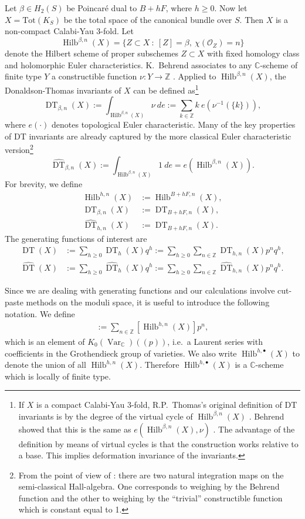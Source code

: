 \documentclass{amsart}
\theoremstyle{definition}
\newcommand{\CC} {\mathbb{C}}          %
\newcommand{\ZZ} {\mathbb{Z}}		%
\renewcommand{\O}{\mathcal{O}}
\newcommand{\Hilb}{\operatorname{Hilb}}
\newcommand{\DT}{\operatorname{DT}}
\newcommand{\Var}{\operatorname{Var}}
\begin{document}
Let $\beta \in H_2(S)$ be Poincar\'e dual to $B+hF$, where $h \geq 0$. 
Now let $X = \mathrm{Tot}(K_S)$ be the total space of the canonical bundle over $S$. Then $X$ is a non-compact Calabi-Yau 3-fold. Let
$$
\Hilb^{\beta,n}(X) = \{ Z \subset X \ : \ [Z] = \beta, \ \chi(\O_Z) = n\}
$$
denote the Hilbert scheme of proper subschemes $Z \subset X$ with fixed homology class and holomorphic Euler characteristics. K.~Behrend associates to any $\CC$-scheme of finite type $Y$ a constructible function $\nu : Y \rightarrow \ZZ$ \cite{Beh}. Applied to $\Hilb^{\beta,n}(X)$, the Donaldson-Thomas invariants of $X$ can be defined as\footnote{If $X$ is a compact Calabi-Yau 3-fold, R.P.~Thomas's original definition of DT invariants is by the degree of the virtual cycle of $\Hilb^{\beta,n}(X)$ \cite{Tho}. Behrend showed that this is the same as $e(\Hilb^{\beta,n}(X),\nu)$ \cite{Beh}. The advantage of the definition by means of virtual cycles is that the construction works relative to a base. This implies deformation invariance of the invariants.} 
$$
\DT_{\beta,n}(X) := \int_{\Hilb^{\beta,n}(X)} \nu \ de := \sum_{k \in \ZZ} k \ e(\nu^{-1}(\{k\})),
$$
where $e(\cdot)$ denotes topological Euler characteristic. Many of the key properties of DT invariants are already captured by the more classical Euler characteristic version\footnote{From the point of view of \cite{Joy, Bri}: there are two natural integration maps on the semi-classical Hall-algebra. One corresponds to weighing by the Behrend function and the other to weighing by the ``trivial'' constructible function which is constant equal to 1.}
$$
\widehat{\DT}_{\beta,n}(X) := \int_{\Hilb^{\beta,n}(X)} 1 \ de = e(\Hilb^{\beta,n}(X)).
$$
For brevity, we define
\begin{align*}
\Hilb^{h,n}(X) &:=\Hilb^{B+hF,n}(X), \\
\DT_{\beta,n}(X) &:= \DT_{B+hF,n}(X), \\
\widehat{\DT}_{h,n}(X) &:= \DT_{B+hF,n}(X).
\end{align*}
The generating functions of interest are
\begin{align*}
\DT(X) &:= \sum_{h \geq 0} \DT_h(X) q^h := \sum_{h \geq 0} \sum_{n \in \ZZ} \DT_{h,n}(X) p^n q^h, \\
\widehat{\DT}(X) &:= \sum_{h \geq 0} \widehat{\DT}_h(X) q^h := \sum_{h \geq 0} \sum_{n \in \ZZ} \widehat{\DT}_{h,n}(X) p^n q^h.
\end{align*}

Since we are dealing with generating functions and our calculations involve cut-paste methods on the moduli space, it is useful to introduce the following notation. We define
\begin{align*}
[\Hilb^{h,\bullet}(X)] := \sum_{n \in \ZZ} [\Hilb^{h,n}(X)] p^n,
\end{align*}
which is an element of $K_0(\Var_{\CC})(\!(p)\!)$, i.e.~a Laurent series with coefficients in the Grothendieck group of varieties. We also write $\Hilb^{h,\bullet}(X)$ to denote the union of all $\Hilb^{h,n}(X)$. Therefore $\Hilb^{h,\bullet}(X)$ is a $\CC$-scheme which is locally of finite type.
\end{document}
